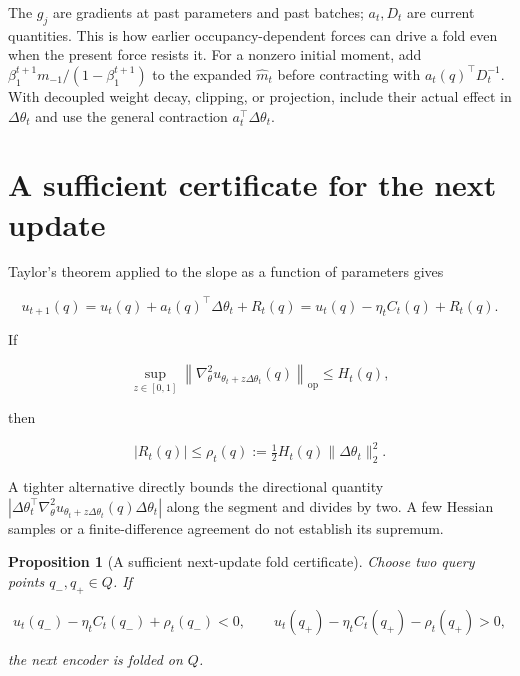 \documentclass[11pt]{article}
\newtheorem{proposition}{Proposition}
\begin{document}
The \(g_j\) are gradients at past parameters and past batches;
\(a_t,D_t\) are current quantities. This is how earlier
occupancy-dependent forces can drive a fold even when the present force
resists it. For a nonzero initial moment, add
\(\beta_1^{t+1}m_{-1}/(1-\beta_1^{t+1})\) to the expanded
\(\widehat m_t\) before contracting with \(a_t(q)^\top D_t^{-1}\). With
decoupled weight decay, clipping, or projection, include their actual
effect in \(\Delta\theta_t\) and use the general contraction
\(a_t^\top\Delta\theta_t\).

\section{A sufficient certificate for the next
update}\label{a-sufficient-certificate-for-the-next-update}

Taylor's theorem applied to the slope as a function of parameters gives

\begin{equation}\label{eq:taylor}
u_{t+1}(q)=u_t(q)+a_t(q)^\top\Delta\theta_t+R_t(q)
=u_t(q)-\eta_t C_t(q)+R_t(q).
\end{equation}

If

\[
\sup_{z\in[0,1]}\left\|\nabla_\theta^2u_{\theta_t+z\Delta\theta_t}(q)\right\|_{\mathrm{op}}\le H_t(q),
\]

then

\begin{equation}\label{eq:remainder}
|R_t(q)|\le\rho_t(q):=\tfrac12H_t(q)\|\Delta\theta_t\|_2^2.
\end{equation}

A tighter alternative directly bounds the directional quantity
\(|\Delta\theta_t^\top\nabla_\theta^2u_{\theta_t+z\Delta\theta_t}(q)\Delta\theta_t|\)
along the segment and divides by two. A few Hessian samples or a
finite-difference agreement do not establish its supremum.

\begin{proposition}[A sufficient next-update fold certificate]
Choose two query points \(q_-,q_+\in Q\). If

\begin{equation}\label{eq:witnesses}
u_t(q_-)-\eta_tC_t(q_-)+\rho_t(q_-)<0,
\qquad
u_t(q_+)-\eta_tC_t(q_+)-\rho_t(q_+)>0,
\end{equation}

the next encoder is folded on \(Q\).
\end{proposition}
\end{document}

